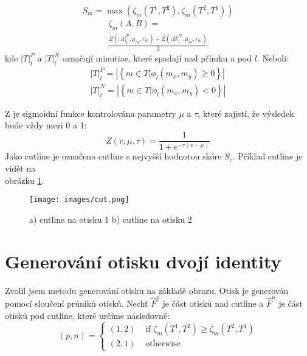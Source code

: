 \documentclass[a4paper,11pt]{article}
\begin{document}
\begin{multicols*}{2}
\begin{equation}
     \end{equation}
     \begin{equation}
         S_{m}=\max \left(\zeta_{m}\left(T^{1}, T^{2}\right), \zeta_{m}\left(T^{2}, T^{1}\right)\right)
     \end{equation}
     \begin{equation}
     \begin{multlined}
         \zeta_{m}(A, B)=\\\frac{Z\left(|A|_{l}^{P}, \mu_{m}, \tau_{m}\right)+Z\left(|B|_{l}^{N}, \mu_{m}, \tau_{m}\right)}{2}
     \end{multlined}
     \end{equation}
     kde $|T|_{l}^{P}$ a $|T|_{l}^{N}$ označují minutiae, které spadají nad přímku a pod $l$. Neboli:
     \begin{equation}
         \begin{array}{l}
            |T|_{l}^{P}=\left|\left\{m \in T | \phi_{l}\left(m_{x}, m_{y}\right) \geq 0\right\}\right| \\
            |T|_{l}^{N}=\left|\left\{m \in T | \phi_{l}\left(m_{x}, m_{y}\right)<0\right\}\right|
        \end{array}
     \end{equation}
     
     Z je sigmoidní funkce kontrolována parametry $\mu$ a $\tau$, které zajistí, že výsledek bude vždy mezi 0 a 1:
     \begin{equation}
         Z(v, \mu, \tau)=\frac{1}{1+e^{-\tau(v-\mu)}}
     \end{equation}
     Jako cutline je označena cutline s nejvyšší hodnotou skóre $S_c$.\cite{main}
     Příklad cutline je vidět na \\ obrázku \ref{fig:cutline}.
     \begin{figure}[H]
        \centering
            {\texttt{[image: images/cut.png]}}\\
            \caption{a) cutline na otisku 1 b) cutline na otisku 2}
            \label{fig:cutline}
    \end{figure}
\section{Generování otisku dvojí identity}
    Zvolil jsem metodu generování otisku na základě obrazu. Otisk je generován pomocí sloučení průniků otisků. Nechť $\hat{F}^{p}$ je část otisků nad cutline a $\hat{F}^{n}$ je část otisků pod cutline, které určíme následovně:
    \begin{equation}
        (p, n)=\left\{\begin{array}{ll}
(1,2) & \text { if } \zeta_{m}\left(T^{1}, T^{2}\right) \geq \zeta_{m}\left(T^{2}, T^{1}\right) \\
(2,1) & \text { otherwise }
\end{array}\right.
    \end{equation}
    

\end{multicols*}
\end{document}
